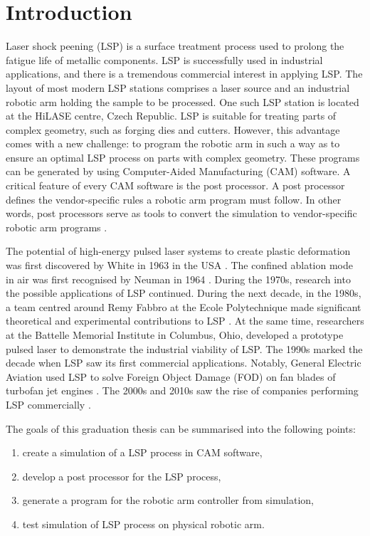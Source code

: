 \chapter{Introduction \label{ch:uvod}}




Laser shock peening (LSP) is a surface treatment process used to prolong the fatigue life of metallic components. LSP is successfully used in industrial applications, and there is a tremendous commercial interest in applying LSP. The layout of most modern LSP stations comprises a laser source and an industrial robotic arm holding the sample to be processed. One such LSP station is located at the HiLASE centre, Czech Republic. LSP is suitable for treating parts of complex geometry, such as forging dies and cutters. However, this advantage comes with a new challenge: to program the robotic arm in such a way as to ensure an optimal LSP process on parts with complex geometry. These programs can be generated by using Computer-Aided Manufacturing (CAM) software. A critical feature of every CAM software is the post processor. A post processor defines the vendor-specific rules a robotic arm program must follow.  In other words, post processors serve as tools to convert the simulation to vendor-specific robotic arm programs \cite{ding_ye_2006}.

The potential of high-energy pulsed laser systems to create plastic deformation was first discovered by White in 1963 in the USA \cite{white_1963}. The confined ablation mode in air was first recognised by Neuman in 1964 \cite{neuman_1964}. During the 1970s, research into the possible applications of LSP continued. During the next decade, in the 1980s, a team centred around Remy Fabbro at the Ecole Polytechnique made significant theoretical and experimental contributions to LSP \cite{fabbro_fournier_ballard_devaux_virmont_1990}. At the same time, researchers at the Battelle Memorial Institute in Columbus, Ohio, developed a prototype pulsed laser to demonstrate the industrial viability of LSP. The 1990s marked the decade when LSP saw its first commercial applications. Notably, General Electric Aviation used LSP to solve Foreign Object Damage (FOD) on fan blades of turbofan jet engines \cite{airforce}. The 2000s and 2010s saw the rise of companies performing LSP commercially \cite{sano}.

The goals of this graduation thesis can be summarised into the following points:
\begin{enumerate}

    \item create a simulation of a LSP process in CAM software,
    \item develop a post processor for the LSP process, 
    \item generate a program  for the robotic arm controller from simulation,
    \item test simulation of LSP process on physical robotic arm.

    
\end{enumerate}

